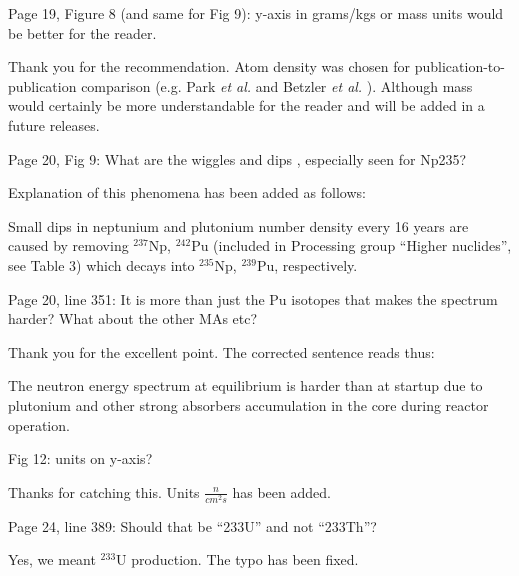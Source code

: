 \documentclass[answers,11pt]{exam}
\begin{document}
\begin{questions}
        \question  Page 19, Figure 8 (and same for Fig 9): y-axis in grams/kgs 
        or mass units would be better for the reader.
        \begin{solution}
                Thank you for the recommendation. Atom density was chosen for publication-to-						publication comparison (e.g. Park \emph{et al.} and Betzler \emph{et al.}
                \cite{park_whole_2015, betzler_molten_2017}). Although mass would certainly 
                be more understandable for the reader and will be added in a future releases.
        \end{solution}

        \question  Page 20, Fig 9: What are the wiggles and dips , especially 
        seen for Np235?
        \begin{solution}
		        Explanation of this phenomena has been added as follows:
        
		         Small dips in neptunium and plutonium number density every 16 years are 
		         caused by removing $^{237}$Np, $^{242}$Pu (included in Processing group 
		         ``Higher nuclides'', see Table 3) which decays
        		  into $^{235}$Np, $^{239}$Pu, respectively. 
        \end{solution}

        \question  Page 20, line 351: It is more than just the Pu isotopes that 
        makes the spectrum harder? What about the other MAs etc?
        \begin{solution}
        		Thank you for the excellent point. The corrected sentence reads thus: 
        
		        The neutron energy spectrum at equilibrium is harder than at startup due 
                to plutonium and other strong absorbers accumulation in the core during 
		        reactor operation.  
        \end{solution}

        \question  Fig 12: units on y-axis?
        \begin{solution}
                Thanks for catching this. Units $\frac{n}{cm^2 s}$ has been added.
        \end{solution}

        \question  Page 24, line 389: Should that be ``233U'' and not ``233Th''?
        \begin{solution}
                Yes, we meant $^{233}$U production. The typo has been fixed.
        \end{solution}


\end{questions}
\end{document}
